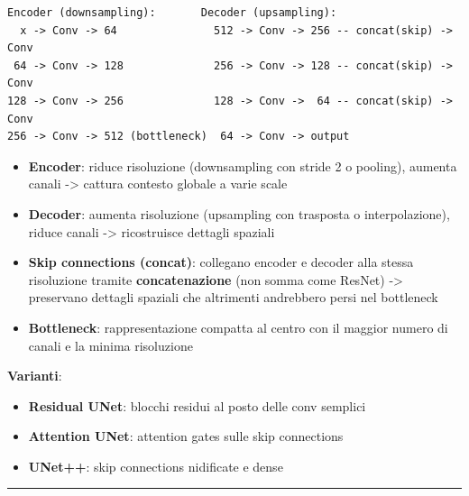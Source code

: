 \documentclass[italian,10pt]{beamer}
\begin{document}
\begin{lstlisting}[style=pp]
Encoder (downsampling):       Decoder (upsampling):
  x -> Conv -> 64               512 -> Conv -> 256 -- concat(skip) -> Conv
 64 -> Conv -> 128              256 -> Conv -> 128 -- concat(skip) -> Conv
128 -> Conv -> 256              128 -> Conv ->  64 -- concat(skip) -> Conv
256 -> Conv -> 512 (bottleneck)  64 -> Conv -> output
\end{lstlisting}
\begin{frame}{}
\begin{itemize}
\item \textbf{Encoder}: riduce risoluzione (downsampling con stride 2 o pooling), aumenta canali -> cattura contesto globale a varie scale
\item \textbf{Decoder}: aumenta risoluzione (upsampling con trasposta o interpolazione), riduce canali -> ricostruisce dettagli spaziali
\item \textbf{Skip connections (concat)}: collegano encoder e decoder alla stessa risoluzione tramite \textbf{concatenazione} (non somma come ResNet) -> preservano dettagli spaziali che altrimenti andrebbero persi nel bottleneck
\item \textbf{Bottleneck}: rappresentazione compatta al centro con il maggior numero di canali e la minima risoluzione
\end{itemize}
\textbf{Varianti}:
\begin{itemize}
\item \textbf{Residual UNet}: blocchi residui al posto delle conv semplici
\item \textbf{Attention UNet}: attention gates sulle skip connections
\item \textbf{UNet++}: skip connections nidificate e dense
\end{itemize}
\medskip\noindent\rule{\textwidth}{0.4pt}\medskip
\end{frame}
\end{document}
